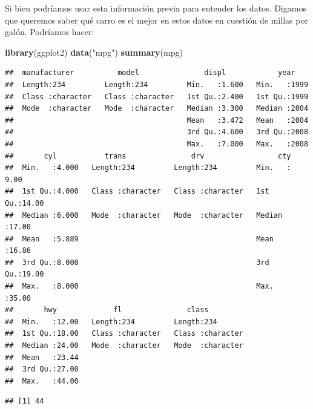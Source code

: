 \documentclass[
]{article}
\newenvironment{Shaded}{\begin{snugshade}}{\end{snugshade}}
\newcommand{\CommentTok}[1]{\textcolor[rgb]{0.56,0.35,0.01}{\textit{#1}}}
\newcommand{\FunctionTok}[1]{\textcolor[rgb]{0.13,0.29,0.53}{\textbf{#1}}}
\newcommand{\NormalTok}[1]{#1}
\newcommand{\SpecialCharTok}[1]{\textcolor[rgb]{0.81,0.36,0.00}{\textbf{#1}}}
\newcommand{\StringTok}[1]{\textcolor[rgb]{0.31,0.60,0.02}{#1}}
\begin{document}
Si bien podríamos usar esta información previa para entender los datos.
Digamos que queremos saber qué carro es el mejor en estos datos en
cuestión de millas por galón. Podríamos hacer:

\begin{Shaded}
\begin{Highlighting}[]
\FunctionTok{library}\NormalTok{(ggplot2)}
\FunctionTok{data}\NormalTok{(}\StringTok{"mpg"}\NormalTok{)}
\FunctionTok{summary}\NormalTok{(mpg)}
\end{Highlighting}
\end{Shaded}

\begin{verbatim}
##  manufacturer          model               displ            year     
##  Length:234         Length:234         Min.   :1.600   Min.   :1999  
##  Class :character   Class :character   1st Qu.:2.400   1st Qu.:1999  
##  Mode  :character   Mode  :character   Median :3.300   Median :2004  
##                                        Mean   :3.472   Mean   :2004  
##                                        3rd Qu.:4.600   3rd Qu.:2008  
##                                        Max.   :7.000   Max.   :2008  
##       cyl           trans               drv                 cty       
##  Min.   :4.000   Length:234         Length:234         Min.   : 9.00  
##  1st Qu.:4.000   Class :character   Class :character   1st Qu.:14.00  
##  Median :6.000   Mode  :character   Mode  :character   Median :17.00  
##  Mean   :5.889                                         Mean   :16.86  
##  3rd Qu.:8.000                                         3rd Qu.:19.00  
##  Max.   :8.000                                         Max.   :35.00  
##       hwy             fl               class          
##  Min.   :12.00   Length:234         Length:234        
##  1st Qu.:18.00   Class :character   Class :character  
##  Median :24.00   Mode  :character   Mode  :character  
##  Mean   :23.44                                        
##  3rd Qu.:27.00                                        
##  Max.   :44.00
\end{verbatim}

\begin{Shaded}
\end{Shaded}

\begin{verbatim}
## [1] 44
\end{verbatim}
\end{document}
